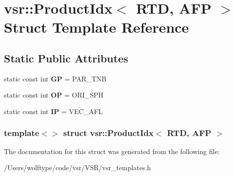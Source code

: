 \hypertarget{structvsr_1_1_product_idx_3_01_r_t_d_00_01_a_f_p_01_4}{\section{vsr\-:\-:Product\-Idx$<$ R\-T\-D, A\-F\-P $>$ Struct Template Reference}
\label{structvsr_1_1_product_idx_3_01_r_t_d_00_01_a_f_p_01_4}
}
\subsection*{Static Public Attributes}
\begin{DoxyCompactItemize}
\item 
\hypertarget{structvsr_1_1_product_idx_3_01_r_t_d_00_01_a_f_p_01_4_af57207265afbb91e0b8a7112c0f14e31}{static const int {\bfseries G\-P} = P\-A\-R\-\_\-\-T\-N\-B}\label{structvsr_1_1_product_idx_3_01_r_t_d_00_01_a_f_p_01_4_af57207265afbb91e0b8a7112c0f14e31}

\item 
\hypertarget{structvsr_1_1_product_idx_3_01_r_t_d_00_01_a_f_p_01_4_acfdad6009eb9ffd82309f979a1667ee6}{static const int {\bfseries O\-P} = O\-R\-I\-\_\-\-S\-P\-H}\label{structvsr_1_1_product_idx_3_01_r_t_d_00_01_a_f_p_01_4_acfdad6009eb9ffd82309f979a1667ee6}

\item 
\hypertarget{structvsr_1_1_product_idx_3_01_r_t_d_00_01_a_f_p_01_4_a4088c1b1214999c6124e670a98ff026d}{static const int {\bfseries I\-P} = V\-E\-C\-\_\-\-A\-F\-L}\label{structvsr_1_1_product_idx_3_01_r_t_d_00_01_a_f_p_01_4_a4088c1b1214999c6124e670a98ff026d}

\end{DoxyCompactItemize}
\subsubsection*{template$<$$>$ struct vsr\-::\-Product\-Idx$<$ R\-T\-D, A\-F\-P $>$}



The documentation for this struct was generated from the following file\-:\begin{DoxyCompactItemize}
\item 
/\-Users/wolftype/code/vsr/\-V\-S\-R/vsr\-\_\-templates.\-h\end{DoxyCompactItemize}
